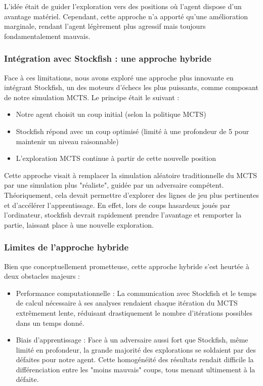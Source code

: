 \documentclass{article}
\begin{document}
L'idée était de guider l'exploration vers des positions où l'agent dispose d'un avantage matériel. Cependant, cette approche n'a apporté qu'une amélioration marginale, rendant l'agent légèrement plus agressif mais toujours fondamentalement mauvais.\\

    \subsubsection{Intégration avec Stockfish : une approche hybride}

    \quad Face à ces limitations, nous avons exploré une approche plus innovante en intégrant Stockfish, un des moteurs d'échecs les plus puissants, comme composant de notre simulation MCTS. Le principe était le suivant :
    \begin{itemize} 
        \item Notre agent choisit un coup initial (selon la politique MCTS)
        \item Stockfish répond avec un coup optimisé (limité à une profondeur de 5 pour maintenir un niveau raisonnable)
        \item L'exploration MCTS continue à partir de cette nouvelle position
    \end{itemize}
    
    Cette approche visait à remplacer la simulation aléatoire traditionnelle du MCTS par une simulation plus "réaliste", guidée par un adversaire compétent. Théoriquement, cela devait permettre d'explorer des lignes de jeu plus pertinentes et d'accélérer l'apprentissage. En effet, lors de coups hasardeux joués par l’ordinateur, stockfish devrait rapidement prendre l’avantage et remporter la partie, laissant place à une nouvelle exploration.\\

    \subsubsection{Limites de l'approche hybride}

    \quad Bien que conceptuellement prometteuse, cette approche hybride s'est heurtée à deux obstacles majeurs :
    \begin{itemize} 
        \item Performance computationnelle : La communication avec Stockfish et le temps de calcul nécessaire à ses analyses rendaient chaque itération du MCTS extrêmement lente, réduisant drastiquement le nombre d'itérations possibles dans un temps donné.
        \item Biais d'apprentissage : Face à un adversaire aussi fort que Stockfish, même limité en profondeur, la grande majorité des explorations se soldaient par des défaites pour notre agent. Cette homogénéité des résultats rendait difficile la différenciation entre les "moins mauvais" coups, tous menant ultimement à la défaite.
    \end{itemize}
    
\end{document}
